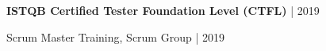 \textbf{ISTQB Certified Tester Foundation Level (CTFL)} | 2019\par
Scrum Master Training, Scrum Group | 2019
